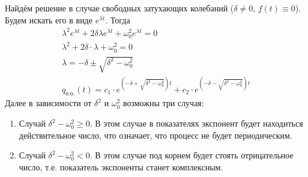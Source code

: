 \documentclass[a4paper, usenames, dvipsnames]{article}
\begin{document}
Найдём решение в случае свободных затухающих колебаний ($\delta \not= 0$, $f(t) \equiv 0$).
Будем искать его в виде $e^{\lambda t}$. Тогда
\begin{gather*}
    \lambda^2e^{\lambda t} + 2\delta\lambda e^{\lambda t} + \omega_0^2 e^{\lambda t} = 0 \\
    \lambda^2 + 2\delta \cdot \lambda + \omega_0^2 = 0 \\
    \lambda = -\delta \pm \sqrt{\delta^2 - \omega_0^2} \\
    q_\text{о.о.}(t) = c_1 \cdot e^{(-\delta + \sqrt{\delta^2 - \omega_0^2})t} + c_2 \cdot e^{(-\delta - \sqrt{\delta^2 - \omega_0^2})t}
\end{gather*}
Далее в зависимости от $\delta^2$ и $\omega_0^2$ возможны три случая:
\begin{enumerate}
    \item Случай $\delta^2 - \omega_0^2 \geqslant 0$. В этом случае в показателях экспонент
          будет находиться действительное число, что означает, что процесс не будет периодическим.
    \item Случай $\delta^2 - \omega_0^2 < 0$. В этом случае под корнем
          будет стоять отрицательное число, т.е. показатель экспоненты станет комплексным.
\end{enumerate}
\end{document}
